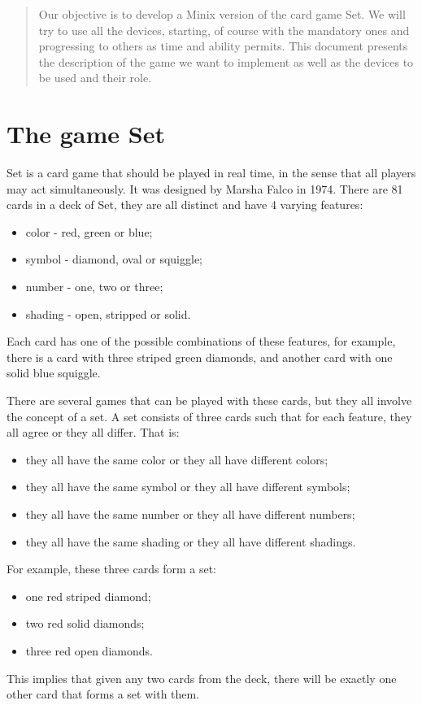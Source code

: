 \documentclass[11pt,a4paper,reqno]{report}
\numberwithin{equation}{section}
\begin{document}



\begin{abstract}
	
Our objective is to develop a Minix version of the card game Set. We will try to use all the devices, starting, of course with the mandatory ones and progressing to others as time and ability permits. This document presents the description of the game we want to implement as well as the devices to be used and their role.

\end{abstract}

\tableofcontents

\chapter{The game Set}

Set is a card game that should be played in real time, in the sense that all players may act simultaneously. It was designed by Marsha Falco in 1974. There are 81 cards in a deck of Set, they are all distinct and have 4 varying features:
\begin{itemize}
\item color - red, green or blue;
\item symbol - diamond, oval or squiggle;
\item number - one, two or three;
\item shading - open, stripped or solid.
\end{itemize}
Each card has one of the possible combinations of these features, for example, there is a card with three striped green diamonds, and another card with one solid blue squiggle.

There are several games that can be played with these cards, but they all involve the concept of a set. A set consists of three cards such that for each feature, they all agree or they all differ. That is:
\begin{itemize}
\item they all have the same color or they all have different colors;
\item they all have the same symbol or they all have different symbols;
\item they all have the same number or they all have different numbers;
\item they all have the same shading or they all have different shadings.
\end{itemize}
For example, these three cards form a set:
\begin{itemize}
\item one red striped diamond;
\item two red solid diamonds;
\item three red open diamonds.
\end{itemize}
This implies that given any two cards from the deck, there will be exactly one other card that forms a set with them.
\end{document}
